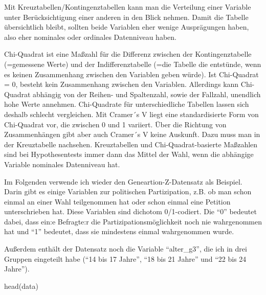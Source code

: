 \documentclass[
]{book}
\newenvironment{Shaded}{\begin{snugshade}}{\end{snugshade}}
\newcommand{\FunctionTok}[1]{\textcolor[rgb]{0.00,0.00,0.00}{#1}}
\newcommand{\NormalTok}[1]{#1}
\begin{document}
Mit Kreuztabellen/Kontingenztabellen kann man die Verteilung einer Variable unter Berücksichtigung einer anderen in den Blick nehmen. Damit die Tabelle übersichtlich bleibt, sollten beide Variablen eher wenige Ausprägungen haben, also eher nominales oder ordinales Datenniveau haben.

Chi-Quadrat ist eine Maßzahl für die Differenz zwischen der Kontingenztabelle (=gemessene Werte) und der Indifferenztabelle (=die Tabelle die entstünde, wenn es keinen Zusammenhang zwischen den Variablen geben würde). Ist Chi-Quadrat = 0, besteht kein Zusammenhang zwischen den Variablen. Allerdings kann Chi-Quadrat abhängig von der Reihen- und Spaltenzahl, sowie der Fallzahl, unendlich hohe Werte annehmen. Chi-Quadrate für unterschiedliche Tabellen lassen sich deshalb schlecht vergleichen. Mit Cramer´s V liegt eine standardisierte Form von Chi-Quadrat vor, die zwischen 0 und 1 variiert. Über die Richtung von Zusammenhängen gibt aber auch Cramer´s V keine Auskunft. Dazu muss man in der Kreuztabelle nachsehen. Kreuztabellen und Chi-Quadrat-basierte Maßzahlen sind bei Hypothesentests immer dann das Mittel der Wahl, wenn die abhängige Variable nominales Datenniveau hat.

Im Folgenden verwende ich wieder den Geneartion-Z-Datensatz als Beispiel. Darin gibt es einige Variablen zur politischen Partizipation, z.B. ob man schon einmal an einer Wahl teilgenommen hat oder schon einmal eine Petition unterschrieben hat. Diese Variablen sind dichotom 0/1-codiert. Die ``0'' bedeutet dabei, dass ein:e Befragte:r die Partizipationsmöglichkeit noch nie wahrgenommen hat und ``1'' bedeutet, dass sie mindestens einmal wahrgenommen wurde.

Außerdem enthält der Datensatz noch die Variable ``alter\_g3'', die ich in drei Gruppen eingeteilt habe (``14 bis 17 Jahre'', ``18 bis 21 Jahre'' und ``22 bis 24 Jahre'').

\begin{Shaded}
\begin{Highlighting}[]
\FunctionTok{head}\NormalTok{(data)}
\end{Highlighting}
\end{Shaded}
\end{document}
